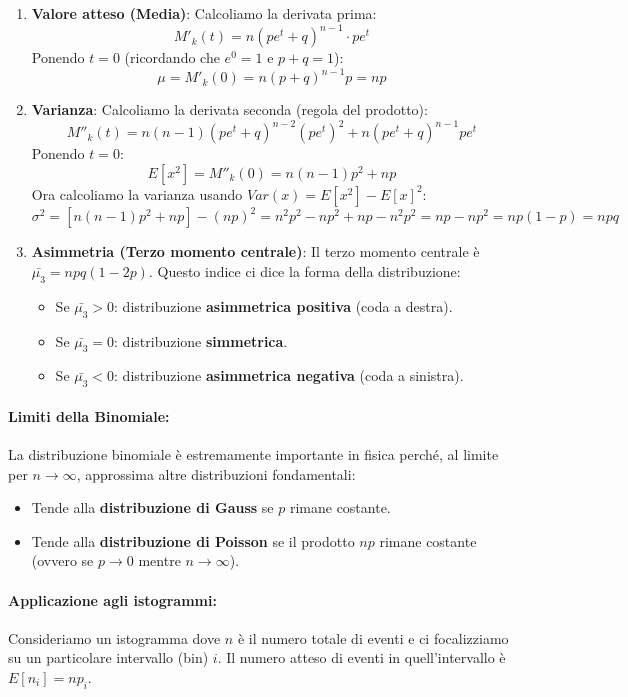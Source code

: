 \documentclass[openany,a4paper,12pt]{book}
\theoremstyle{remark}
\begin{document}
\begin{enumerate}
    \item \textbf{Valore atteso (Media)}:
    Calcoliamo la derivata prima:
    \[ M'_k(t) = n(pe^t+q)^{n-1} \cdot pe^t \]
    Ponendo $t=0$ (ricordando che $e^0=1$ e $p+q=1$):
    \[ \mu = M'_k(0) = n(p+q)^{n-1}p = np \]

    \item \textbf{Varianza}:
    Calcoliamo la derivata seconda (regola del prodotto):
    \[ M''_k(t) = n(n-1)(pe^t+q)^{n-2}(pe^t)^2 + n(pe^t+q)^{n-1}pe^t \]
    Ponendo $t=0$:
    \[ E[x^2] = M''_k(0) = n(n-1)p^2 + np \]
    Ora calcoliamo la varianza usando $Var(x) = E[x^2] - E[x]^2$:
    \[
    \sigma^2 = [n(n-1)p^2 + np] - (np)^2 = n^2p^2 - np^2 + np - n^2p^2 = np - np^2 = np(1-p) = npq
    \]

    \item \textbf{Asimmetria (Terzo momento centrale)}:
    Il terzo momento centrale è $\bar{\mu_3} = npq(1-2p)$. Questo indice ci dice la forma della distribuzione:
    \begin{itemize}
        \item Se $\bar{\mu_3} > 0$: distribuzione \textbf{asimmetrica positiva} (coda a destra).
        \item Se $\bar{\mu_3} = 0$: distribuzione \textbf{simmetrica}.
        \item Se $\bar{\mu_3} < 0$: distribuzione \textbf{asimmetrica negativa} (coda a sinistra).
    \end{itemize}
\end{enumerate}

\vspace{0.5cm}

\paragraph{Limiti della Binomiale:}
La distribuzione binomiale è estremamente importante in fisica perché, al limite per $n \to \infty$, approssima altre distribuzioni fondamentali:
\begin{itemize}
    \item Tende alla \textbf{distribuzione di Gauss} se $p$ rimane costante.
    \item Tende alla \textbf{distribuzione di Poisson} se il prodotto $np$ rimane costante (ovvero se $p \to 0$ mentre $n \to \infty$).
\end{itemize}

\paragraph{Applicazione agli istogrammi:}
Consideriamo un istogramma dove $n$ è il numero totale di eventi e ci focalizziamo su un particolare intervallo (bin) $i$.
Il numero atteso di eventi in quell'intervallo è $E[n_i] = n p_i$.
\end{document}
